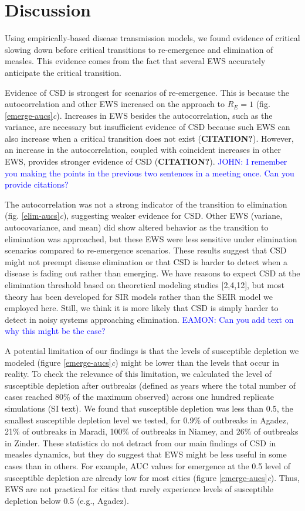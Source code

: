 \documentclass[3p]{elsarticle} %
\begin{document}
\hypertarget{discussion}{%
\section{Discussion}\label{discussion}}

Using empirically-based disease transmission models, we found evidence
of critical slowing down before critical transitions to re-emergence and
elimination of measles. This evidence comes from the fact that several
EWS accurately anticipate the critical transition.

Evidence of CSD is strongest for scenarios of re-emergence. This is
because the autocorrelation and other EWS increased on the approach to
\(R_E = 1\) (fig. \ref{emerge-aucs}\emph{c}). Increases in EWS besides
the autocorrelation, such as the variance, are necessary but
insufficient evidence of CSD because such EWS can also increase when a
critical transition does not exist (\textbf{CITATION?}). However, an
increase in the autocorrelation, coupled with coincident increases in
other EWS, provides stronger evidence of CSD (\textbf{CITATION?}).
\textcolor{blue}{JOHN: I remember you making the points in the previous two sentences in a meeting once. Can you provide citations?}

The autocorrelation was not a strong indicator of the transition to
elimination (fig. \ref{elim-aucs}\emph{c}), suggesting weaker evidence
for CSD. Other EWS (variane, autocovariance, and mean) did show altered
behavior as the transition to elimination was approached, but these EWS
were less sensitive under elimination scenarios compared to re-emergence
scenarios. These results suggest that CSD might not preempt disease
elimination or that CSD is harder to detect when a disease is fading out
rather than emerging. We have reasons to expect CSD at the elimination
threshold based on theoretical modeling studies {[}2,4,12{]}, but most
theory has been developed for SIR models rather than the SEIR model we
employed here. Still, we think it is more likely that CSD is simply
harder to detect in noisy systems approaching elimination.
\textcolor{blue}{EAMON: Can you add text on why this might be the case?}

A potential limitation of our findings is that the levels of susceptible
depletion we modeled (figure \ref{emerge-aucs}\emph{c}) might be lower
than the levels that occur in reality. To check the relevance of this
limitation, we calculated the level of susceptible depletion after
outbreaks (defined as years where the total number of cases reached 80\%
of the maximum observed) across one hundred replicate simulations (SI
text). We found that susceptible depletion was less than 0.5, the
smallest susceptible depletion level we tested, for 0.9\% of outbreaks
in Agadez, 21\% of outbreaks in Maradi, 100\% of outbreaks in Niamey,
and 26\% of outbreaks in Zinder. These statistics do not detract from
our main findings of CSD in measles dynamics, but they do suggest that
EWS might be less useful in some cases than in others. For example, AUC
values for emergence at the 0.5 level of susceptible depletion are
already low for most cities (figure \ref{emerge-aucs}\emph{c}). Thus,
EWS are not practical for cities that rarely experience levels of
susceptible depletion below 0.5 (e.g., Agadez).
\end{document}
